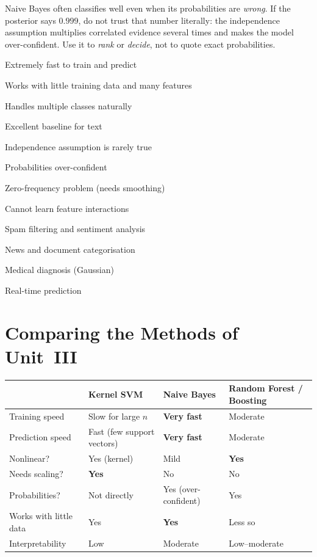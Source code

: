 \begin{warning}
Naive Bayes often classifies well even when its probabilities are \emph{wrong}. If the posterior says $0.999$, do not trust that number literally: the independence assumption multiplies correlated evidence several times and makes the model over-confident. Use it to \emph{rank} or \emph{decide}, not to quote exact probabilities.
\end{warning}

{\item Extremely fast to train and predict
 \item Works with little training data and many features
 \item Handles multiple classes naturally
 \item Excellent baseline for text}
{\item Independence assumption is rarely true
 \item Probabilities over-confident
 \item Zero-frequency problem (needs smoothing)
 \item Cannot learn feature interactions}
{\item Spam filtering and sentiment analysis
 \item News and document categorisation
 \item Medical diagnosis (Gaussian)
 \item Real-time prediction}

\section{Comparing the Methods of Unit~III}

\begin{center}
\small
\begin{tabular}{@{}p{3.2cm}p{3.6cm}p{3.4cm}p{3.6cm}@{}}
\toprule
 & \textbf{Kernel SVM} & \textbf{Naive Bayes} & \textbf{Random Forest / Boosting}\\
\midrule
Training speed & Slow for large $n$ & \textbf{Very fast} & Moderate\\
Prediction speed & Fast (few support vectors) & \textbf{Very fast} & Moderate\\
Nonlinear? & Yes (kernel) & Mild & \textbf{Yes}\\
Needs scaling? & \textbf{Yes} & No & No\\
Probabilities? & Not directly & Yes (over-confident) & Yes\\
Works with little data & Yes & \textbf{Yes} & Less so\\
Interpretability & Low & Moderate & Low--moderate\\
\end{tabular}
\end{center}

